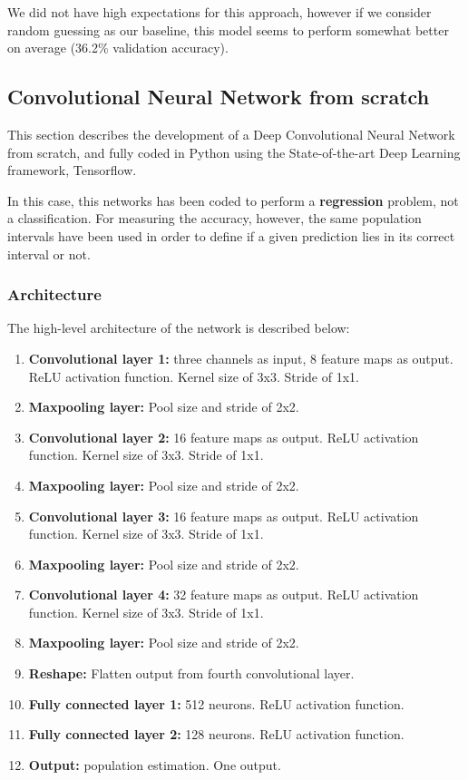 \documentclass{article}
\begin{document}
We did not have high expectations for this approach, however if we consider random guessing as our baseline, this model seems to perform somewhat better on average (36.2\% validation accuracy). 

\subsection{Convolutional Neural Network from scratch}
This section describes the development of a Deep Convolutional Neural Network from scratch, and fully coded in Python using the State-of-the-art Deep Learning framework, Tensorflow.

In this case, this networks has been coded to perform a \textbf{regression} problem, not a classification. For measuring the accuracy, however, the same population intervals have been used in order to define if a given prediction lies in its correct interval or not.

 \subsubsection{Architecture}
 
 The high-level architecture of the network is described below:
 \begin{enumerate}
\item \textbf{Convolutional layer 1:} three channels as input, 8 feature maps as output. ReLU activation function. Kernel size of 3x3. Stride of 1x1.
\item \textbf{Maxpooling layer:} Pool size and stride of 2x2.
\item \textbf{Convolutional layer 2:} 16 feature maps as output. ReLU activation function. Kernel size of 3x3. Stride of 1x1.
\item \textbf{Maxpooling layer:} Pool size and stride of 2x2.
\item \textbf{Convolutional layer 3:} 16 feature maps as output. ReLU activation function. Kernel size of 3x3. Stride of 1x1.
\item \textbf{Maxpooling layer:} Pool size and stride of 2x2.
\item \textbf{Convolutional layer 4:} 32 feature maps as output. ReLU activation function. Kernel size of 3x3. Stride of 1x1.
\item \textbf{Maxpooling layer:} Pool size and stride of 2x2.
\item \textbf{Reshape:} Flatten output from fourth convolutional layer.
\item \textbf{Fully connected layer 1:} 512 neurons. ReLU activation function.
\item \textbf{Fully connected layer 2:} 128 neurons. ReLU activation function.
\item \textbf{Output:} population estimation. One output.
 \end{enumerate}
\end{document}
